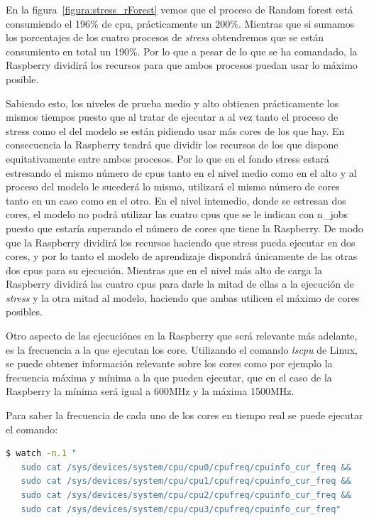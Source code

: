 \documentclass[a4paper, 12pt]{book}
\begin{document}
En la figura~\ref{figura:stress_rForest} vemos que el proceso de Random forest está consumiendo el 196\% de cpu, prácticamente un 200\%. Mientras que si sumamos los porcentajes de los cuatro procesos de \textit{stress} obtendremos que se están consumiento en total un 190\%. Por lo que a pesar de lo que se ha comandado, la Raspberry dividirá los recursos para que ambos procesos puedan usar lo máximo posible.

Sabiendo esto, los niveles de prueba medio y alto obtienen prácticamente los mismos tiempos puesto que al tratar de ejecutar a al vez tanto el proceso de stress como el del modelo se están pidiendo usar más cores de los que hay. En consecuencia la Raspberry tendrá que dividir los recursos de los que dispone equitativamente entre ambos procesos. Por lo que en el fondo stress estará estresando el mismo número de cpus tanto en el nivel medio como en el alto y al proceso del modelo le sucederá lo mismo, utilizará el mismo número de cores tanto en un caso como en el otro. En el nivel intemedio, donde se estresan dos cores, el modelo no podrá utilizar las cuatro cpus que se le indican con n\_jobs puesto que estaría superando el número de cores que tiene la Raspberry. De modo que la Raspberry dividirá los recursos haciendo que stress pueda ejecutar en dos cores, y por lo tanto el modelo de aprendizaje dispondrá únicamente de las otras dos cpus para su ejecución. Mientras que en el nivel más alto de carga la Raspberry dividirá las cuatro cpus para darle la mitad de ellas a la ejecución de \textit{stress} y la otra mitad al modelo, haciendo que ambas utilicen el máximo de cores posibles.

Otro aspecto de las ejecuciónes en la Raspberry  que será relevante más adelante, es la frecuencia a la que ejecutan los core. Utilizando el comando \textit{lscpu} de Linux, se puede obtener información relevante sobre los cores como por ejemplo la frecuencia máxima y mínima a la que pueden ejecutar, que en el caso de la Raspberry la mínima será igual a 600MHz y la máxima 1500MHz. 

Para saber la frecuencia de cada uno de los cores en tiempo real se puede ejecutar el comando:\\

\begin{lstlisting}[language=bash, showstringspaces=false]
   $ watch -n.1 "
   sudo cat /sys/devices/system/cpu/cpu0/cpufreq/cpuinfo_cur_freq && 
   sudo cat /sys/devices/system/cpu/cpu1/cpufreq/cpuinfo_cur_freq && 
   sudo cat /sys/devices/system/cpu/cpu2/cpufreq/cpuinfo_cur_freq && 
   sudo cat /sys/devices/system/cpu/cpu3/cpufreq/cpuinfo_cur_freq"
\end{lstlisting}
\end{document}
